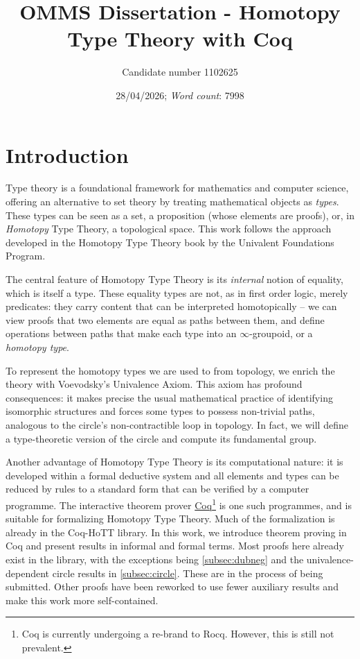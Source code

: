 \documentclass[12 pt]{amsart}
\title{OMMS Dissertation - Homotopy Type Theory with Coq}
\author{Candidate number 1102625}
\date{28/04/2026; \textit{Word count}: 7998}
\theoremstyle{definition}
\theoremstyle{remark}
\begin{document}
\maketitle

\thispagestyle{empty}

\newpage
\setcounter{page}{1}

\section{Introduction}

Type theory is a foundational framework for mathematics and computer science, offering an alternative to set theory by treating mathematical objects as \textit{types}. These types can be seen as a set, a proposition (whose elements are proofs), or, in \textit{Homotopy} Type Theory, a topological space. This work follows the approach developed in the Homotopy Type Theory book by the Univalent Foundations Program\cite{hottbook}.

The central feature of Homotopy Type Theory is its \textit{internal} notion of equality, which is itself a type. These equality types are not, as in first order logic, merely predicates: they carry content that can be interpreted homotopically -- we can view proofs that two elements are equal as paths between them, and define operations between paths that make each type into an $\infty$-groupoid, or a \textit{homotopy type}.


To represent the homotopy types we are used to from topology, we enrich the theory with Voevodsky's Univalence Axiom. This axiom has profound consequences: it makes precise the usual mathematical practice of identifying isomorphic structures and forces some types to possess non-trivial paths, analogous to the circle's non-contractible loop in topology. In fact, we will define a type-theoretic version of the circle and compute its fundamental group.

Another advantage of Homotopy Type Theory is its computational nature: it is developed within a formal deductive system and all elements and types can be reduced by rules to a standard form that can be verified by a computer programme. The interactive theorem prover \href{https://rocq-prover.org}{Coq}\footnote{Coq is currently undergoing a re-brand to Rocq. However, this is still not prevalent.} is one such programmes, and is suitable for formalizing Homotopy Type Theory. Much of the formalization is already in the Coq-HoTT library\cite{coq-hott}. In this work, we introduce theorem proving in Coq and present results in informal and formal terms. Most proofs here already exist in the library, with the exceptions being \ref{subsec:dubneg} and the univalence-dependent circle results in \ref{subsec:circle}. These are in the process of being submitted. Other proofs have been reworked to use fewer auxiliary results and make this work more self-contained.
\end{document}
